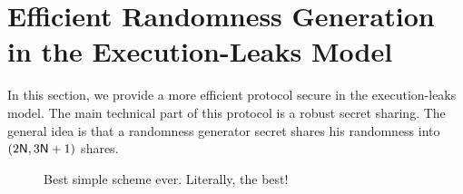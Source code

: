 \section{Efficient Randomness Generation in the Execution-Leaks Model}

In this section, we provide a more efficient protocol secure in the execution-leaks model. The main technical part of this protocol is a robust secret sharing. The general idea is that a randomness generator secret shares his randomness into $(2\mathsf{N}, 3\mathsf{N}+1)$ shares. 

\begin{figure}[ht!]%
	\centering%
	\nicoresetlinenr
	\caption{Best simple scheme ever. Literally, the best!}
	\label{simple-figure}
\end{figure}